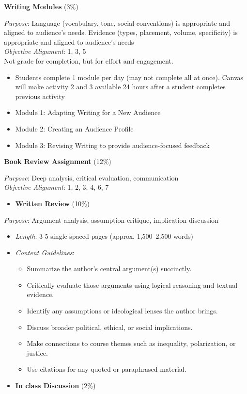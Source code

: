 \documentclass[]{tufte-handout}
\providecommand{\tightlist}{%
  \setlength{\itemsep}{0pt}\setlength{\parskip}{0pt}}
\begin{document}
\textbf{Writing Modules} (3\%)

\emph{Purpose}: Language (vocabulary, tone, social conventions) is
appropriate and aligned to audience's needs. Evidence (types, placement,
volume, specificity) is appropriate and aligned to audience's needs\\
\emph{Objective Alignment}: 1, 3, 5\\
Not grade for completion, but for effort and engagement.

\begin{itemize}
\tightlist
\item
  Students complete 1 module per day (may not complete all at once).
  Canvas will make activity 2 and 3 available 24 hours after a student
  completes previous activity
\item
  Module 1: Adapting Writing for a New Audience
\item
  Module 2: Creating an Audience Profile
\item
  Module 3: Revising Writing to provide audience-focused feedback
\end{itemize}

\textbf{Book Review Assignment} (12\%)

\emph{Purpose}: Deep analysis, critical evaluation, communication\\
\emph{Objective Alignment}: 1, 2, 3, 4, 6, 7

\begin{itemize}
\tightlist
\item
  \textbf{Written Review} (10\%)
\end{itemize}

\emph{Purpose}: Argument analysis, assumption critique, implication
discussion

\begin{itemize}
\tightlist
\item
  \emph{Length}: 3-5 single-spaced pages (approx. 1,500--2,500 words)
\item
  \emph{Content Guidelines}:

  \begin{itemize}
  \tightlist
  \item
    Summarize the author's central argument(s) succinctly.
  \item
    Critically evaluate those arguments using logical reasoning and
    textual evidence.
  \item
    Identify any assumptions or ideological lenses the author brings.
  \item
    Discuss broader political, ethical, or social implications.
  \item
    Make connections to course themes such as inequality, polarization,
    or justice.
  \item
    Use citations for any quoted or paraphrased material.
  \end{itemize}
\item
  \textbf{In class Discussion} (2\%)
\end{itemize}
\end{document}
